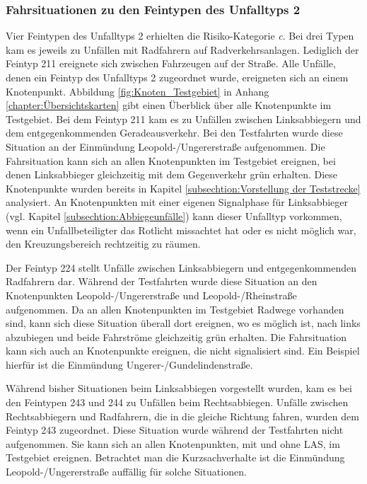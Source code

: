 \subsubsection{Fahrsituationen zu den Feintypen des Unfalltyps 2}
Vier Feintypen des Unfalltyps 2 erhielten die Risiko-Kategorie \textit{c}. Bei drei Typen kam es jeweils zu Unfällen mit Radfahrern auf Radverkehrsanlagen. Lediglich der Feintyp 211 ereignete sich zwischen Fahrzeugen auf der Straße. Alle Unfälle, denen ein Feintyp des Unfalltyps 2 zugeordnet wurde, ereigneten sich an einem Knotenpunkt. Abbildung \ref{fig:Knoten_Testgebiet} in Anhang \ref{chapter:Übersichtskarten} gibt einen Überblick über alle Knotenpunkte im Testgebiet. Bei dem Feintyp 211  kam es zu Unfällen zwischen Linksabbiegern und dem entgegenkommenden Geradeausverkehr. Bei den Testfahrten wurde diese Situation an der Einmündung Leopold-/Ungererstraße aufgenommen. Die Fahrsituation kann sich an allen Knotenpunkten im Testgebiet ereignen, bei denen Linksabbieger gleichzeitig mit dem Gegenverkehr grün erhalten. Diese Knotenpunkte wurden bereits in Kapitel \ref{subsechtion:Vorstellung der Teststrecke} analysiert. An Knotenpunkten mit einer eigenen Signalphase für Linksabbieger (vgl. Kapitel \ref{subsechtion:Abbiegeunfälle}) kann dieser Unfalltyp vorkommen, wenn ein Unfallbeteiligter das Rotlicht missachtet hat oder es nicht möglich war, den Kreuzungsbereich rechtzeitig zu räumen.

Der Feintyp 224 stellt Unfälle zwischen Linksabbiegern und entgegenkommenden Radfahrern dar. Während der Testfahrten wurde diese Situation an den Knotenpunkten Leopold-/Ungererstraße und Leopold-/Rheinstraße aufgenommen. Da an allen Knotenpunkten im Testgebiet Radwege vorhanden sind, kann sich diese Situation überall dort ereignen, wo es möglich ist, nach links abzubiegen und beide Fahrströme gleichzeitig grün erhalten. Die Fahrsituation kann sich auch an Knotenpunkte ereignen, die nicht signalisiert sind. Ein Beispiel hierfür ist die Einmündung Ungerer-/Gundelindenstraße.

Während bisher Situationen beim Linksabbiegen vorgestellt wurden, kam es bei den Feintypen 243 und 244 zu Unfällen beim Rechtsabbiegen. Unfälle zwischen Rechtsabbiegern und Radfahrern, die in die gleiche Richtung fahren, wurden dem Feintyp 243 zugeordnet. Diese Situation wurde während der Testfahrten nicht aufgenommen. Sie kann sich an allen Knotenpunkten, mit und ohne LAS, im Testgebiet ereignen. Betrachtet man die Kurzsachverhalte ist die Einmündung Leopold-/Ungererstraße auffällig für solche Situationen.


